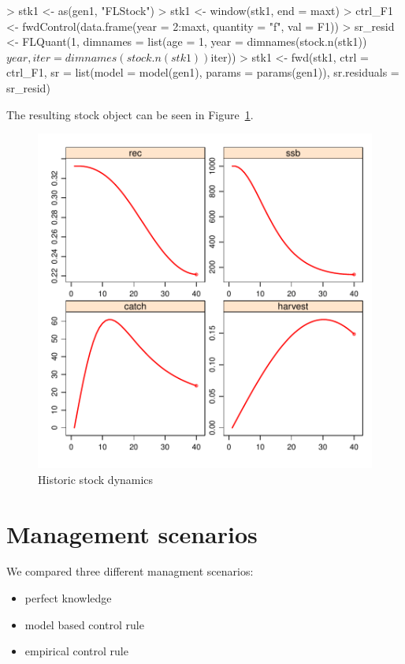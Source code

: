 \documentclass[a4paper]{article}
\begin{document}
\begin{Schunk}
\begin{Sinput}
> stk1 <- as(gen1, "FLStock")
> stk1 <- window(stk1, end = maxt)
> ctrl_F1 <- fwdControl(data.frame(year = 2:maxt, quantity = "f", val = F1))
> sr_resid <- FLQuant(1, dimnames = list(age = 1, year = dimnames(stock.n(stk1))$year, iter = dimnames(stock.n(stk1))$iter))
> stk1 <- fwd(stk1, ctrl = ctrl_F1, sr = list(model = model(gen1), params = params(gen1)), sr.residuals = sr_resid)
\end{Sinput}
\end{Schunk}

The resulting stock object can be seen in Figure~\ref{fig:hist_proj}.

\begin{figure}
\centering
\includegraphics{script-hist_proj_plot}
\caption{Historic stock dynamics}
\label{fig:hist_proj}
\end{figure}


\section{Management scenarios}

We compared three different managment scenarios:
\begin{itemize}
\item perfect knowledge
\item model based control rule
\item empirical control rule
\end{itemize}
\end{document}
